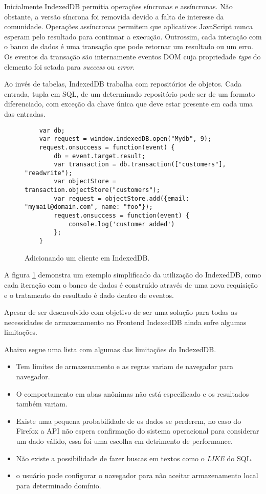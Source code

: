 Inicialmente IndexedDB permitia operações síncronas e assíncronas.
Não obstante, a versão síncrona foi removida devido a falta de
interesse da comunidade. Operações assíncronas permitem que
aplicativos JavaScript nunca esperam pelo resultado para continuar a
execução. Outrossim, cada interação com o banco de dados é uma
transação que pode retornar um resultado ou um erro. Os eventos da
transação são internamente eventos DOM cuja propriedade \textit{type}
do elemento foi setada para \textit{success} ou \textit{error}.

Ao invés de tabelas, IndexedDB trabalha com repositórios de objetos.
Cada entrada, tupla em SQL, de um determinado repositório pode ser de
um formato diferenciado, com exceção da chave única que deve estar
presente em cada uma das entradas.

\begin{figure}
\centering
\begin{verbatim}
	var db;
	var request = window.indexedDB.open("Mydb", 9);
	request.onsuccess = function(event) {
		db = event.target.result;
		var transaction = db.transaction(["customers"], "readwrite");
		var objectStore = transaction.objectStore("customers");
		var request = objectStore.add({email: "mymail@domain.com", name: "foo"});
		request.onsuccess = function(event) {
			console.log('customer added')
		};
	}
\end{verbatim}
\caption{Adicionando um cliente em IndexedDB.}
\label{fig:IndexedDB}
\end{figure}

A figura \ref{fig:IndexedDB} demonstra um exemplo simplificado da
utilização do IndexedDB, como cada iteração com o banco de dados é
construído através de uma nova requisição e o tratamento do resultado
é dado dentro de eventos.

Apesar de ser desenvolvido com objetivo de ser uma solução para todas
as necessidades de armazenamento no Frontend IndexedDB ainda sofre
algumas limitações.

Abaixo segue uma lista com algumas das limitações do IndexedDB.

\begin{itemize}
\item Tem limites de armazenamento e as regras variam de navegador para navegador.
\item O comportamento em abas anônimas não está especificado e os resultados também variam.
\item Existe uma pequena probabilidade de os dados se perderem, no caso do Firefox a API não espera confirmação do sistema operacional para considerar um dado válido, essa foi uma escolha em detrimento de performance.
\item Não existe a possibilidade de fazer buscas em textos como o \textit{LIKE} do SQL.
\item o usuário pode configurar o navegador para não aceitar armazenamento local para determinado domínio.
\end{itemize}

